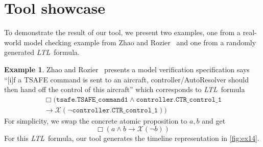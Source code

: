 \documentclass[preprint,12pt]{elsarticle}
\theoremstyle{definition}
\newtheorem{example}{Example}[section]
\theoremstyle{remark}
\newcommand{\always}{\Box}
\newcommand{\nextt}{\mathcal{X}}
\newcommand{\limplies}{\rightarrow}
\newcommand{\ltl}{\textit{LTL}}
\newcommand{\tand}{\land}
\newcommand{\tor}{\lor}
\newcommand{\tnot}{\lnot}
\begin{document}
\section{Tool showcase} \label{sec:tool-showcase}
To demonstrate the result of our tool, we present two examples, one from a real-world model checking example from Zhao and Rozier~\cite{ZR14} and one from a randomly generated \ltl\ formula.

\begin{example} \label{example:air}
    Zhao and Rozier~\cite{ZR14} presents a model verification specification says ``[i]f a TSAFE command is sent to an aircraft, controller/AutoResolver should then hand off the control of this aircraft'' which corresponds to \ltl\ formula
    \begin{align*}
        \always (\texttt{tsafe.TSAFE\_command1} \land \texttt{controller.CTR\_control\_1} \\
        \limplies \nextt (\neg \texttt{controller.CTR\_control\_1}))
    \end{align*}
    For simplicity, we swap the concrete atomic proposition to $a,b$ and get
    \[
        \always (a \land b \limplies \nextt (\neg b))
    \]
    For this \ltl\ formula, our tool generates the timeline representation in \cref{fig:ex14}.
    \begin{figure}[h!]
        \centering
        \resizebox{\textwidth}{!}{
}
\end{figure}
\end{example}
\end{document}

